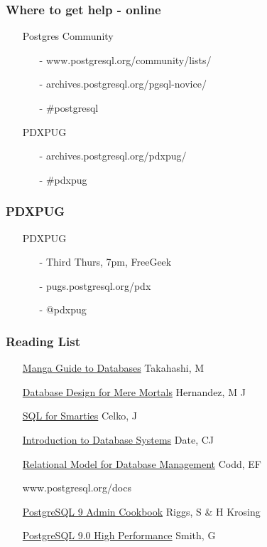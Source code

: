 \documentclass[20pt]{beamer}
\begin{document}
\frame
{
    \frametitle{Where to get help - online}
    \begin{itemize}
    \item[] Postgres Community
        \begin{itemize}
        \item[-] www.postgresql.org/community/lists/
        \item[-] archives.postgresql.org/pgsql-novice/
        \item[-] \#postgresql
        \end{itemize}
    \item[] PDXPUG
        \begin{itemize}
            \item[-] archives.postgresql.org/pdxpug/
            \item[-] \#pdxpug
        \end{itemize}
    \end{itemize}
}

\frame
{
    \frametitle{PDXPUG}
    \begin{itemize}
    \item[] PDXPUG
	    \begin{itemize}
	    \item[-] Third Thurs, 7pm, FreeGeek
	    \item[-] pugs.postgresql.org/pdx
	    \item[-] @pdxpug
	    \end{itemize}
    \end{itemize}
}

\frame
{
    \frametitle{Reading List}
    \begin{itemize}
    \item[] \underline{Manga Guide to Databases} Takahashi, M
    \item[] \underline{Database Design for Mere Mortals} Hernandez, M J
    \item[] \underline{SQL for Smarties} Celko, J
    \item[] \underline{Introduction to Database Systems} Date, CJ
    \item[] \underline{Relational Model for Database Management} Codd, EF
    \item[] www.postgresql.org/docs
    \item[] \underline{PostgreSQL 9 Admin Cookbook} Riggs, S \& H Krosing
    \item[] \underline{PostgreSQL 9.0 High Performance} Smith, G
    \end{itemize}
}

\end{document}
